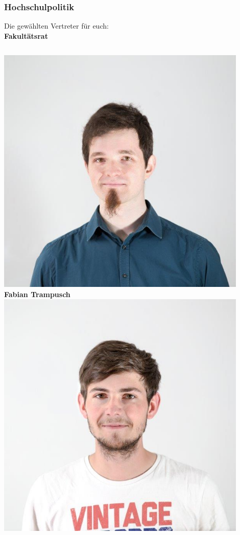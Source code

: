 \documentclass{beamer}
\begin{document}
    \begin{frame}[t]
    	\frametitle{Hochschulpolitik}
    	Die gewählten Vertreter für euch:\\
    	\bigskip
    	\textbf{Fakultätsrat}
    	\bigskip
    	\begin{columns}[t]
    		\includegraphics[width=0.9\textwidth]{fabian.jpg}
    		\\
    		\textbf{Fabian Trampusch}
    		\includegraphics[width=0.9\textwidth]{anselm.jpg}

\end{columns}
\end{frame}
\end{document}
